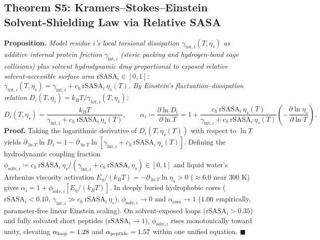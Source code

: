 \documentclass[10pt,letterpaper]{article}
\begin{document}
\subsection{Theorem S5: Kramers--Stokes--Einstein Solvent-Shielding Law via Relative SASA}
\textbf{Proposition.} \textit{Model residue $i$'s local torsional dissipation $\gamma_{\mathrm{tot},i}(T,\eta_s)$ as additive internal protein friction $\gamma_{\mathrm{int},i}$ (steric packing and hydrogen-bond cage collisions) plus solvent hydrodynamic drag proportional to exposed relative solvent-accessible surface area $\mathrm{rSASA}_i \in [0,1]$: $\gamma_{\mathrm{tot},i}(T,\eta_s) = \gamma_{\mathrm{int},i} + c_h\,\mathrm{rSASA}_i\,\eta_s(T)$. By Einstein's fluctuation--dissipation relation $D_i(T,\eta_s) = k_B T / \gamma_{\mathrm{tot},i}(T,\eta_s)$:}
\[
D_i(T,\eta_s) = \frac{k_B T}{\gamma_{\mathrm{int},i} + c_h\,\mathrm{rSASA}_i\,\eta_s(T)}, \qquad \alpha_i \coloneqq \frac{\partial \ln D_i}{\partial \ln T} = 1 + \frac{c_h\,\mathrm{rSASA}_i\,\eta_s(T)}{\gamma_{\mathrm{int},i} + c_h\,\mathrm{rSASA}_i\,\eta_s(T)}\left(-\frac{\partial \ln \eta_s}{\partial \ln T}\right).
\]
\textbf{Proof.} Taking the logarithmic derivative of $D_i(T,\eta_s(T))$ with respect to $\ln T$ yields $\partial_{\ln T}\ln D_i = 1 - \partial_{\ln T}\ln[\gamma_{\mathrm{int},i} + c_h\,\mathrm{rSASA}_i\,\eta_s(T)]$. Defining the hydrodynamic coupling fraction $\phi_{\mathrm{solv},i} \coloneqq c_h\,\mathrm{rSASA}_i\,\eta_s / (\gamma_{\mathrm{int},i} + c_h\,\mathrm{rSASA}_i\,\eta_s) \in [0,1]$ and liquid water's Arrhenius viscosity activation $E_\eta/(k_B T) = -\partial_{\ln T}\ln\eta_s > 0$ ($\approx 6.0$ near $300\text{ K}$) gives $\alpha_i = 1 + \phi_{\mathrm{solv},i}[E_\eta/(k_B T)]$. In deeply buried hydrophobic cores ($\mathrm{rSASA}_i < 0.10$, $\gamma_{\mathrm{int},i} \gg c_h\,\mathrm{rSASA}_i\,\eta_s$), $\phi_{\mathrm{solv},i} \to 0$ and $\alpha_{\mathrm{core}} \to 1$ ($1.00{}$ empirically, parameter-free linear Einstein scaling). On solvent-exposed loops ($\mathrm{rSASA}_i > 0.35$) and fully solvated short peptides ($\mathrm{rSASA}_i \to 1$), $\phi_{\mathrm{solv},i}$ rises monotonically toward unity, elevating $\alpha_{\mathrm{loop}} = 1.28{}$ and $\alpha_{\mathrm{peptide}} = 1.57{}$ within one unified equation. $\blacksquare$
\end{document}
